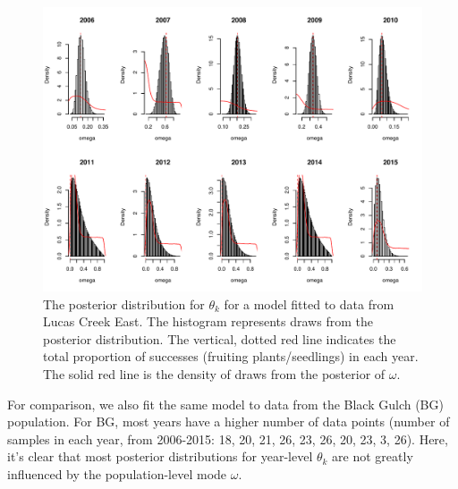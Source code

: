 \documentclass[12pt, oneside, titlepage]{article}   	%
\begin{document}
 \begin{figure}[h]
   \centering
       \includegraphics[page=1,width=.9\textwidth]{../figures/appendix-x-hierarchical}  
    \caption{ The posterior distribution for $\theta_k$ for a model fitted to data from Lucas Creek East. The histogram represents draws from the posterior distribution. The vertical, dotted red line indicates the total proportion of successes (fruiting plants/seedlings) in each year. The solid red line is the density of draws from the posterior of $\omega$. }
 \label{fig:hierarchical}
\end{figure}

For comparison, we also fit the same model to data from the Black Gulch (BG) population. For BG, most years have a higher number of data points (number of samples in each year, from 2006-2015: 18, 20, 21, 26, 23, 26, 20, 23, 3, 26). Here, it's clear that most posterior distributions for year-level $\theta_k$ are not greatly influenced by the population-level mode $\omega$. 
\end{document}
